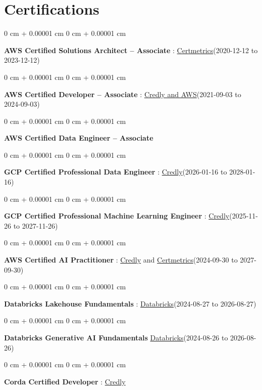 \documentclass[10pt, letterpaper]{article}
\newenvironment{onecolentry}{
    \begin{adjustwidth}{
        0 cm + 0.00001 cm
    }{
        0 cm + 0.00001 cm
    }
}{
    \end{adjustwidth}
} %
\begin{document}
    \vspace{2 pt }
    \section{Certifications}
        \vspace{2 pt }
        \begin{samepage}
            \begin{onecolentry}
                \textbf{AWS Certified Solutions Architect – Associate} : \href{https://cp.certmetrics.com/amazon/en/public/verify/credential/SNBY48EBJJVE1SWX}{Certmetrics}(2020-12-12 to 2023-12-12)
            \end{onecolentry}
            \begin{onecolentry}
                \textbf{AWS Certified Developer – Associate} : \href{https://www.credly.com/badges/b8106fbd-d3d1-4204-8cdf-e708798fd582/public_url}{Credly and AWS}(2021-09-03  to 2024-09-03)
            \end{onecolentry}
            \begin{onecolentry}
                \textbf{AWS Certified Data Engineer – Associate}
            \end{onecolentry}
            \begin{onecolentry}
                \textbf{GCP Certified Professional Data Engineer} : \href{https://www.credly.com/badges/977e96d9-12e7-4f6c-b8a7-df71fb7153b8/public_url}{Credly}(2026-01-16 to 2028-01-16)
            \end{onecolentry}
            \begin{onecolentry}
                \textbf{GCP Certified Professional Machine Learning Engineer} : \href{https://www.credly.com/badges/a6965347-09ea-4d8f-b398-0e151407160d/public_url}{Credly}(2025-11-26 to 2027-11-26)
            \end{onecolentry}
            \begin{onecolentry}
                \textbf{AWS Certified AI Practitioner} : \href{https://www.credly.com/badges/451b7ba5-8be1-4a8e-bbec-ade26627a6b6/public_url}{Credly} and \href{https://cp.certmetrics.com/amazon/en/public/verify/credential/495f0d9853874bf9a33c17f8e89ce131}{Certmetrics}(2024-09-30 to 2027-09-30)
            \end{onecolentry}
            \begin{onecolentry}
                \textbf{Databricks Lakehouse Fundamentals} : \href{https://scl.io/FXGKS0u}{Databricks}(2024-08-27 to 2026-08-27)
            \end{onecolentry}
            \begin{onecolentry}
                \textbf{Databricks Generative AI Fundamentals} \href{https://sgq.io/3uIFGNi}{Databricks}(2024-08-26 to 2026-08-26)
            \end{onecolentry}
            \begin{onecolentry}
                \textbf{Corda Certified Developer} : \href{https://www.credly.com/badges/7f29d39c-34b6-4de9-b07d-e10f1090a335/linked_in_profile}{Credly}
            \end{onecolentry}
        \end{samepage}
\end{document}
